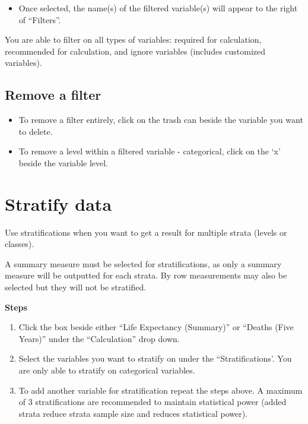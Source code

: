 \documentclass[]{book}
\providecommand{\tightlist}{%
  \setlength{\itemsep}{0pt}\setlength{\parskip}{0pt}}
\begin{document}
\begin{itemize}
\tightlist
\item
  Once selected, the name(s) of the filtered variable(s) will appear to
  the right of ``Filters''.
\end{itemize}

You are able to filter on all types of variables: required for
calculation, recommended for calculation, and ignore variables (includes
customized variables).

\subsection{Remove a filter}\label{remove-a-filter}

\begin{itemize}
\item
  To remove a filter entirely, click on the trash can beside the
  variable you want to delete.
\item
  To remove a level within a filtered variable - categorical, click on
  the `x' beside the variable level.
\end{itemize}

\section{Stratify data}\label{stratify-data}

Use stratifications when you want to get a result for multiple strata
(levels or classes).

A summary measure must be selected for stratifications, as only a
summary measure will be outputted for each strata. By row measurements
may also be selected but they will not be stratified.

\textbf{Steps}

\begin{enumerate}
\def\labelenumi{\arabic{enumi}.}
\item
  Click the box beside either ``Life Expectancy (Summary)'' or ``Deaths
  (Five Years)'' under the ``Calculation'' drop down.
\item
  Select the variables you want to stratify on under the
  ``Stratifications'. You are only able to stratify on categorical
  variables.
\item
  To add another variable for stratification repeat the steps above. A
  maximum of 3 stratifications are recommended to maintain statistical
  power (added strata reduce strata sample size and reduces statistical
  power).
\end{enumerate}
\end{document}
